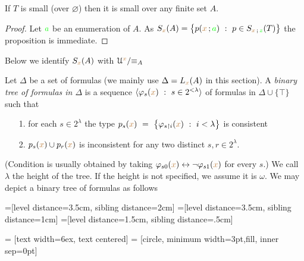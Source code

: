 \begin{proposition}
If $T$ is small (over $\varnothing$) then it is small over any finite set $A$.
\end{proposition}

\begin{proof}
Let ${\color{green} a}$ be an enumeration of $A$.
As $S_{\mr x}(A)=\big\{p({\mr x}\,;{\gr a})\ :\ p\in S_{{\mr x}\,;\,{\gr z}}(T)\big\}$ the proposition is immediate.
\end{proof}

Below we identify $S_{\color{brown} x}(A)$ with $\EuScript U^{\color{brown} x}/\mathord\equiv_A$

\begin{definition}\label{def_tree_formulas}
Let $\Delta$ be a set of formulas (we mainly use $\Delta=L_{\color{brown} x}(A)$ in this section).
A \emph{binary tree of formulas in $\Delta$\/} is a sequence $\<\phi_s({\mr x})\ :\ s\in2^{<\lambda}\>$ of formulas in $\Delta\cup\{\top\}$ such that\nobreak
\begin{itemize}
\item[1.] for each $s\in 2^\lambda$ the type $p_s({\mr x})\ =\ \big\{\phi_{s\restriction i}({\mr x})\ :\ i<\lambda\big\}$ is consistent
\item[2.] $p_s({\color{brown} x})\cup p_r({\color{brown} x})$ is inconsistent for any two distinct $s,r\in 2^\lambda$.
\end{itemize}
(Condition  is usually obtained by taking $\varphi_{s0}({\color{brown} x})\leftrightarrow\neg\varphi_{s1}({\color{brown} x})$ for every $s$.)
We call $\lambda$ the height of the tree.
If the height is not specified, we assume it is $\omega$.
We may depict a binary tree of formulas as follows
\baselineskip

=[level distance=3.5cm, sibling distance=2cm]
=[level distance=3.5cm, sibling distance=1cm]
=[level distance=1.5cm, sibling distance=.5cm]

 = [text width=6ex, text centered]
 = [circle, minimum width=3pt,fill, inner sep=0pt]

\def\leaf{...}


\end{definition}

